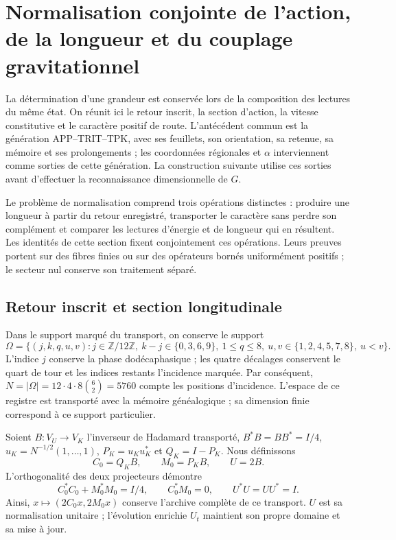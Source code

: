 \clearpage
\section{Normalisation conjointe de l’action, de la longueur et du couplage gravitationnel}
\label{md:rigidez}

La détermination d’une grandeur est conservée lors de la composition des lectures du
même état. On réunit ici le retour inscrit, la section d’action, la
vitesse constitutive et le caractère positif de route. L’antécédent commun
est la génération APP--TRIT--TPK, avec ses feuillets, son orientation, sa retenue, sa mémoire
et ses prolongements ; les coordonnées régionales et $\alpha$ interviennent comme
sorties de cette génération. La construction suivante utilise ces sorties
avant d’effectuer la reconnaissance dimensionnelle de $G$.

Le problème de normalisation comprend trois opérations distinctes : produire
une longueur à partir du retour enregistré, transporter le caractère sans perdre
son complément et comparer les lectures d’énergie et de longueur qui en résultent.
Les identités de cette section fixent conjointement ces opérations. Leurs
preuves portent sur des fibres finies ou sur des opérateurs bornés uniformément
positifs ; le secteur nul conserve son traitement séparé.

\subsection{Retour inscrit et section longitudinale}
\label{md:rigidez:longitud}

Dans le support marqué du transport, on conserve le support
\[
 \Omega=\{(j,k,q,u,v):j\in\mathbb Z/12\mathbb Z,\ 
 k-j\in\{0,3,6,9\},\ 1\le q\le8,\
 u,v\in\{1,2,4,5,7,8\},\ u<v\}.
\]
L’indice $j$ conserve la phase dodécaphasique ; les quatre décalages
conservent le quart de tour et les indices restants l’incidence marquée.
Par conséquent, $N=|\Omega|=12\cdot4\cdot8\binom62=5760$ compte les positions
d’incidence. L’espace de ce registre est transporté avec la mémoire
généalogique ; sa dimension finie correspond à ce support particulier.

Soient $B:V_U\to V_K$ l’inverseur de Hadamard transporté,
$B^*B=BB^*=I/4$, $u_K=N^{-1/2}(1,\ldots,1)$,
$P_K=u_Ku_K^*$ et $Q_K=I-P_K$. Nous définissons
\[
 C_0=Q_KB,\qquad M_0=P_KB,\qquad U=2B.
\]
L’orthogonalité des deux projecteurs démontre
\[
 C_0^*C_0+M_0^*M_0=I/4,\qquad C_0^*M_0=0,\qquad U^*U=UU^*=I.
\]
Ainsi, $x\mapsto(2C_0x,2M_0x)$ conserve l’archive complète de ce
transport. $U$ est sa normalisation unitaire ; l’évolution enrichie
$U_t$ maintient son propre domaine et sa mise à jour.

